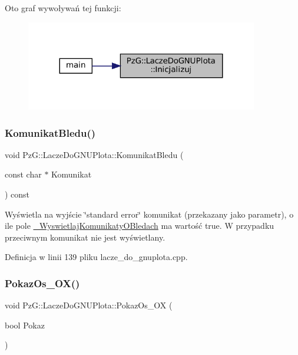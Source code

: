 Oto graf wywoływań tej funkcji\+:\nopagebreak
\begin{figure}[H]
\begin{center}
\leavevmode
\includegraphics[width=287pt]{class_pz_g_1_1_lacze_do_g_n_u_plota_a200ce6bdb980c314a9eafe49e8f2dd5e_icgraph}
\end{center}
\end{figure}
\mbox{\label{class_pz_g_1_1_lacze_do_g_n_u_plota_a90056743aeaa546721528005f2cf41e6}} 
\subsubsection{\texorpdfstring{KomunikatBledu()}{KomunikatBledu()}}
{\footnotesize\ttfamily void Pz\+G\+::\+Lacze\+Do\+G\+N\+U\+Plota\+::\+Komunikat\+Bledu (\begin{DoxyParamCaption}\item[{const char $\ast$}]{Komunikat }\end{DoxyParamCaption}) const\hspace{0.3cm}{\ttfamily [protected]}}

Wyświetla na wyjście \char`\"{}standard error\char`\"{} komunikat (przekazany jako parametr), o ile pole \mbox{\hyperlink{class_pz_g_1_1_lacze_do_g_n_u_plota_a2f2800f14ebfe1caef0b4d30c410a7fe}{\+\_\+\+Wyswietlaj\+Komunikaty\+O\+Bledach}} ma wartość {\ttfamily true}. W przypadku przeciwnym komunikat nie jest wyświetlany. 

Definicja w linii 139 pliku lacze\+\_\+do\+\_\+gnuplota.\+cpp.

\mbox{\label{class_pz_g_1_1_lacze_do_g_n_u_plota_a11421d7c67deab6b7524cc492407e897}} 
\subsubsection{\texorpdfstring{PokazOs\_OX()}{PokazOs\_OX()}\hspace{0.1cm}{\footnotesize\ttfamily [1/2]}}
{\footnotesize\ttfamily void Pz\+G\+::\+Lacze\+Do\+G\+N\+U\+Plota\+::\+Pokaz\+Os\+\_\+\+OX (\begin{DoxyParamCaption}\item[{bool}]{Pokaz }\end{DoxyParamCaption})\hspace{0.3cm}{\ttfamily [inline]}}

